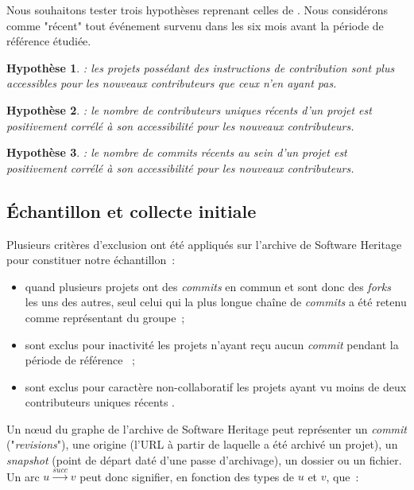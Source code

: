 \documentclass[dvipsnames,runningheads]{llncs}
\newcommand{\en}[1]{\foreignlanguage{english}{\emph{#1}}}
\newtheorem{hypo}{Hypothèse}[theorem]
\begin{document}
    Nous souhaitons tester trois hypothèses reprenant celles de \textcite{signals-2019}. Nous considérons
    comme "récent" tout événement survenu dans les six mois avant la période de référence étudiée.

    \newcommand{\newhyp}[2]{%
        \begin{hypo}
            \label{hyp:#1}: #2
        \end{hypo}%
    }

    \newhyp{contributionguidelines}{%
        les projets possédant des instructions de contribution sont plus accessibles pour les nouveaux
        contributeurs que ceux n'en ayant pas.%
    }

    \newhyp{recentcontributorcount}{%
        le nombre de contributeurs uniques récents d'un projet est positivement corrélé à son accessibilité
        pour les nouveaux contributeurs.%
    }

    \newhyp{recentcommitcount}{%
        le nombre de \en{commits} récents au sein d'un projet est positivement corrélé à son accessibilité
        pour les nouveaux contributeurs.%
    }

    \subsection{Échantillon et collecte initiale}
    \label{sec:constitution_echantillon}

    Plusieurs critères d'exclusion ont été appliqués sur l'archive de Software Heritage pour constituer notre
    échantillon :

    \begin{itemize}
        \item quand plusieurs projets ont des \en{commits} en commun et sont donc des \en{forks} les uns des
            autres, seul celui qui la plus longue chaîne de \en{commits} a été retenu comme représentant du
            groupe ;
        \item sont exclus pour inactivité les projets n'ayant reçu aucun \en{commit} pendant la période de
            référence \parencite{mining-github-2014} ;
        \item sont exclus pour caractère non-collaboratif les projets ayant vu moins de deux contributeurs
            uniques récents \parencite{mining-github-2014}.
    \end{itemize}

    Un nœud du graphe de l'archive de Software Heritage peut représenter un \en{commit} ("\en{revisions}"),
    une origine (l'URL à partir de laquelle a été archivé un projet), un \en{snapshot} (point de départ daté
    d'une passe d'archivage), un dossier ou un fichier. Un arc $u \xrightarrow{succ} v$ peut donc signifier,
    en fonction des types de $u$ et $v$, que : 
\end{document}
